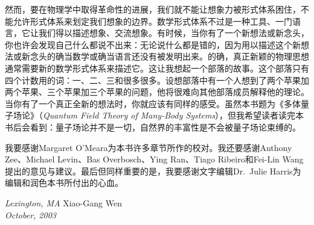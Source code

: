 然而，要在物理学中取得革命性的进展，我们就不能让想象力被形式体系困住，不能允许形式体系来划定我们想象的边界。数学形式体系不过是一种工具、一门语言，它让我们得以描述想象、交流想象。有时候，当你有了一个新想法或新念头，你也许会发现自己什么都说不出来：无论说什么都是错的，因为用以描述这个新想法或新念头的确当数学或确当语言还没有被发明出来。的确，真正新颖的物理思想通常需要新的数学形式体系来描述它。这让我想起一个部落的故事。这个部落只有四个计数用的词：一、二、三和很多很多。设想部落中有一个人想到了两个苹果加两个苹果、三个苹果加三个苹果的问题，他将很难向其他部落成员解释他的理论。当你有了一个真正全新的想法时，你就应该有同样的感受。虽然本书题为《多体量子场论》（\emph{Quantum Field Theory of Many-Body Systems}），但我希望读者读完本书后会看到：量子场论并不是一切，自然界的丰富性是不会被量子场论束缚的。

我要感谢Margaret O'Meara为本书许多章节所作的校对。我还要感谢Anthony Zee、Michael Levin、Bas Overbosch、Ying Ran、Tiago Ribeiro和Fei-Lin Wang提出的意见与建议。最后但同样重要的是，我要感谢文字编辑Dr.~Julie Harris为编辑和润色本书所付出的心血。

\begin{flushleft}
\emph{Lexington, MA} \hfill Xiao-Gang Wen\\[0.5em]
\emph{October, 2003}
\end{flushleft}
